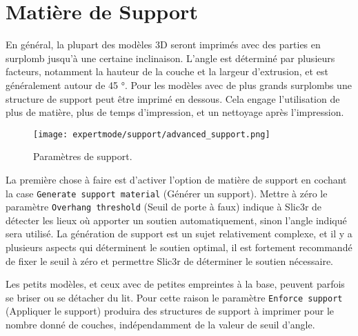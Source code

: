 \section{Mati\`ere de Support} %
\label{sec:support}

En g\'en\'eral, la plupart des mod\`eles 3D seront imprim\'es avec des parties en surplomb jusqu'\`a une certaine inclinaison. L'angle est d\'etermin\'e par plusieurs facteurs, notamment la hauteur de la couche et la largeur d'extrusion, et est g\'en\'eralement autour de 45 °. Pour les mod\`eles avec de plus grands surplombs une structure de support peut \^etre imprim\'e en dessous. Cela engage l'utilisation de plus de mati\`ere, plus de temps d'impression, et un nettoyage apr\`es l'impression.

\begin{figure}[H]
\centering
\texttt{[image: expertmode/support/advanced\_support.png]}
\caption{Param\`etres de support.}
\label{fig:advanced_support}
\end{figure}

La premi\`ere chose \`a faire est d'activer l'option de mati\`ere de support en cochant la case \texttt{Generate support material} (G\'en\'erer un support).  Mettre \`a z\'ero le param\`etre \texttt{Overhang threshold} (Seuil de porte \`a faux) indique \`a Slic3r de d\'etecter les lieux o\`u apporter un soutien automatiquement, sinon l'angle indiqu\'e sera utilis\'e.  La g\'en\'eration de support est un sujet relativement complexe, et il y a plusieurs aspects qui d\'eterminent le soutien optimal, il est fortement recommand\'e de fixer le seuil \`a z\'ero et permettre Slic3r de d\'eterminer le soutien n\'ecessaire.

Les petits mod\`eles, et ceux avec de petites empreintes \`a la base, peuvent parfois se briser ou se d\'etacher du lit.  Pour cette raison le param\`etre \texttt{Enforce support} (Appliquer le support) produira des structures de support \`a imprimer pour le nombre donn\'e de couches, ind\'ependamment de la valeur de seuil d'angle.

